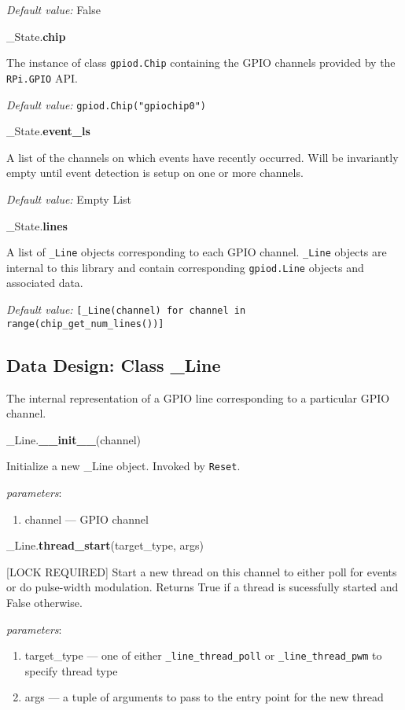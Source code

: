 \documentclass[12pt]{article}
\begin{document}
\textit{Default value:} False

\noindent \_State.\textbf{chip}

The instance of class \texttt{gpiod.Chip} containing the GPIO channels provided by the \texttt{RPi.GPIO} API.

\textit{Default value:} \texttt{gpiod.Chip("gpiochip0")}

\noindent \_State.\textbf{event\_ls}

A list of the channels on which events have recently occurred. Will be invariantly empty until event detection is setup on one or more channels.

\textit{Default value:} Empty List

\noindent \_State.\textbf{lines}

A list of \texttt{\_Line} objects corresponding to each GPIO channel. \texttt{\_Line} objects are internal to this library and contain corresponding \texttt{gpiod.Line} objects and associated data.

\textit{Default value:} \texttt{[\_Line(channel) for channel in range(chip\_get\_num\_lines())]}

\subsection{Data Design: Class \_Line}

The internal representation of a GPIO line corresponding to a particular GPIO channel.

\medskip

\noindent \_Line.\textbf{\_\_init\_\_}(channel)
        
Initialize a new \_Line object. Invoked by \texttt{Reset}.

\textit{parameters}:
\begin{enumerate}
        \item channel --- GPIO channel
\end{enumerate}
 
\noindent \_Line.\textbf{thread\_start}(target\_type, args)

[LOCK REQUIRED] Start a new thread on this channel to either poll for events or do pulse-width modulation.
Returns True if a thread is sucessfully started and False otherwise.

\textit{parameters}:
\begin{enumerate}
	\item target\_type --- one of either \texttt{\_line\_thread\_poll} or \texttt{\_line\_thread\_pwm} to specify thread type
	\item args --- a tuple of arguments to pass to the entry point for the new thread
\end{enumerate}
\end{document}
